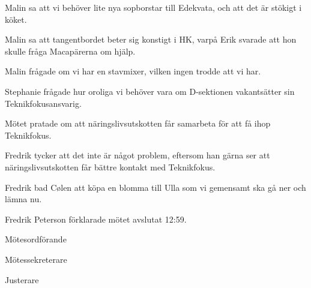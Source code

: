 \documentclass[10pt]{article}
\def\mo{Fredrik Peterson}
\def\ms{Erik Månsson}
\def\ji{Johan Persson}
\begin{document}
\begin{paragrafer}
\Ibfu

Malin sa att vi behöver lite nya sopborstar till Edekvata, och att det är stökigt i köket.

Malin sa att tangentbordet beter sig konstigt i HK, varpå Erik svarade att hon skulle fråga Macapärerna om hjälp.

Malin frågade om vi har en stavmixer, vilken ingen trodde att vi har.


Stephanie frågade hur oroliga vi behöver vara om D-sektionen vakantsätter sin Teknikfokusansvarig.

Mötet pratade om att näringslivsutskotten får samarbeta för att få ihop Teknikfokus.

Fredrik tycker att det inte är något problem, eftersom han gärna ser att näringslivsutskotten får bättre kontakt med Teknikfokus.

Fredrik bad Cølen att köpa en blomma till Ulla som vi gemensamt ska gå ner och lämna nu.

{\mo} förklarade mötet avslutat 12:59.

\end{paragrafer}

\newpage
\hidesignfoot
\begin{signatures}{3}
\signature{\mo}{Mötesordförande}
\signature{\ms}{Mötessekreterare}
\signature{\ji}{Justerare}
\end{signatures}
\end{document}
